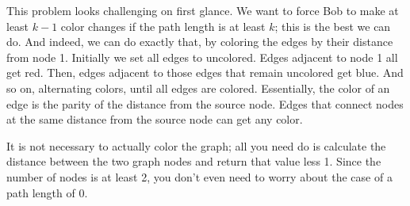 
\noindent
This problem looks challenging on first glance.  We want to force
Bob to make at least $k-1$ color changes if the path length is at
least $k$; this is the best we can do.  And indeed, we can do
exactly that, by coloring the edges by their distance from node 1.
Initially we set all edges to uncolored.
Edges adjacent to node 1 all get red.  Then, edges adjacent to those
edges that remain uncolored get blue.  And so on, alternating colors,
until all edges are colored.  Essentially, the color of an edge is
the parity of the distance from the source node.  Edges that
connect nodes at the same distance from the source node can get any
color.

It is not necessary to actually color the graph; all you need do is
calculate the distance between the two graph nodes and return that
value less 1.  Since the number of nodes is at least 2, you don't
even need to worry about the case of a path length of 0.
